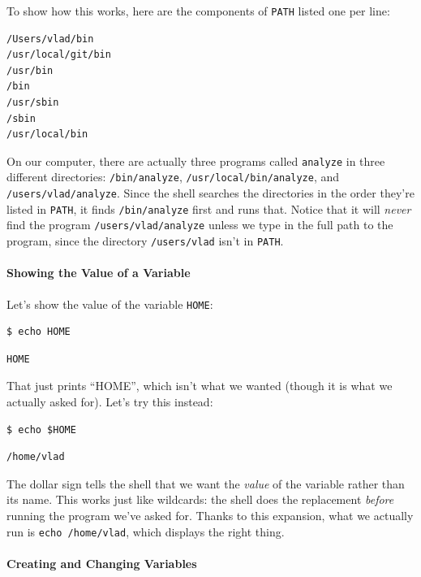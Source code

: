 \documentclass{book}
\begin{document}
To show how this works, here are the components of \texttt{PATH} listed
one per line:

\begin{verbatim}
/Users/vlad/bin
/usr/local/git/bin
/usr/bin
/bin
/usr/sbin
/sbin
/usr/local/bin
\end{verbatim}

On our computer, there are actually three programs called
\texttt{analyze} in three different directories: \texttt{/bin/analyze},
\texttt{/usr/local/bin/analyze}, and \texttt{/users/vlad/analyze}. Since
the shell searches the directories in the order they're listed in
\texttt{PATH}, it finds \texttt{/bin/analyze} first and runs that.
Notice that it will \emph{never} find the program
\texttt{/users/vlad/analyze} unless we type in the full path to the
program, since the directory \texttt{/users/vlad} isn't in
\texttt{PATH}.

\mbox{}\paragraph{Showing the Value of a Variable}

Let's show the value of the variable \texttt{HOME}:

\begin{verbatim}
$ echo HOME
\end{verbatim}

\begin{verbatim}
HOME
\end{verbatim}

That just prints ``HOME'', which isn't what we wanted (though it is what
we actually asked for). Let's try this instead:

\begin{verbatim}
$ echo $HOME
\end{verbatim}

\begin{verbatim}
/home/vlad
\end{verbatim}

The dollar sign tells the shell that we want the \emph{value} of the
variable rather than its name. This works just like wildcards: the shell
does the replacement \emph{before} running the program we've asked for.
Thanks to this expansion, what we actually run is
\texttt{echo /home/vlad}, which displays the right thing.

\mbox{}\paragraph{Creating and Changing Variables}
\end{document}
